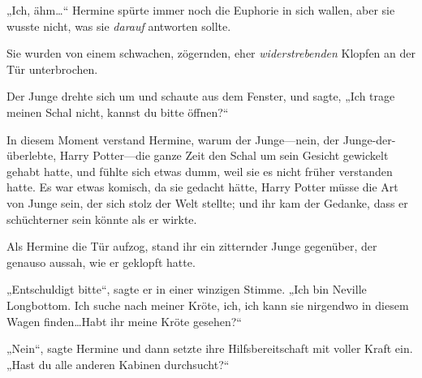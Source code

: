 „Ich, ähm…“ Hermine spürte immer noch die Euphorie in sich wallen, aber sie wusste nicht, was sie \emph{darauf} antworten sollte.

Sie wurden von einem schwachen, zögernden, eher \emph{widerstrebenden} Klopfen an der Tür unterbrochen.

Der Junge drehte sich um und schaute aus dem Fenster, und sagte, „Ich trage meinen Schal nicht, kannst du bitte öffnen?“

In diesem Moment verstand Hermine, warum der Junge—nein, der Junge-der-überlebte, Harry Potter—die ganze Zeit den Schal um sein Gesicht gewickelt gehabt hatte, und fühlte sich etwas dumm, weil sie es nicht früher verstanden hatte. Es war etwas komisch, da sie gedacht hätte, Harry Potter müsse die Art von Junge sein, der sich stolz der Welt stellte; und ihr kam der Gedanke, dass er schüchterner sein könnte als er wirkte.

Als Hermine die Tür aufzog, stand ihr ein zitternder Junge gegenüber, der genauso aussah, wie er geklopft hatte.

„Entschuldigt bitte“, sagte er in einer winzigen Stimme. „Ich bin Neville Longbottom. Ich suche nach meiner Kröte, ich, ich kann sie nirgendwo in diesem Wagen finden…Habt ihr meine Kröte gesehen?“

„Nein“, sagte Hermine und dann setzte ihre Hilfsbereitschaft mit voller Kraft ein. „Hast du alle anderen Kabinen durchsucht?“

